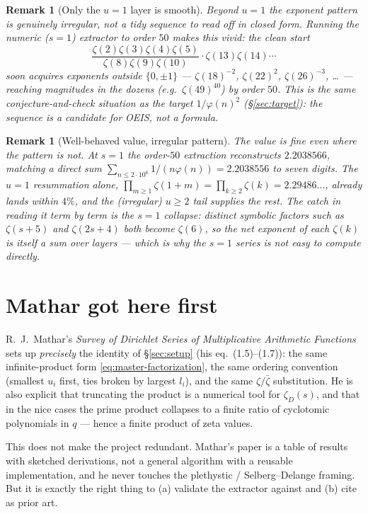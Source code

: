 \documentclass[11pt]{article}
\newtheorem{remark}[theorem]{Remark}
\newcommand{\zD}{\zeta_D}
\newcommand{\zbar}{\bar\zeta}
\begin{document}
\begin{remark}[Only the $u=1$ layer is smooth]
Beyond $u=1$ the exponent pattern is genuinely irregular, not a tidy sequence to read
off in closed form. Running the numeric ($s=1$) extractor to order $50$ makes this
vivid: the clean start
\[
\frac{\zeta(2)\zeta(3)\zeta(4)\zeta(5)}{\zeta(8)\zeta(9)\zeta(10)}\cdot
\zeta(13)\zeta(14)\cdots
\]
soon acquires exponents outside $\{0,\pm1\}$ --- $\zeta(18)^{-2}$, $\zeta(22)^{2}$,
$\zeta(26)^{-3}$, \dots{} --- reaching magnitudes in the dozens (e.g.\
$\zeta(49)^{40}$) by order $50$. This is the same conjecture-and-check situation as the
target $1/\varphi(n)^2$ (\S\ref{sec:target}): the sequence is a candidate for OEIS, not
a formula.
\end{remark}

\begin{remark}[Well-behaved value, irregular pattern]
The \emph{value} is fine even where the \emph{pattern} is not. At $s=1$ the order-$50$
extraction reconstructs $2.2038566$, matching a direct sum
$\sum_{n\le2\cdot10^{6}}1/(n\varphi(n))=2.2038556$ to seven digits. The $u=1$
resummation alone, $\prod_{m\ge1}\zeta(1+m)=\prod_{k\ge2}\zeta(k)=2.29486\ldots$,
already lands within $4\%$, and the (irregular) $u\ge2$ tail supplies the rest. The
catch in reading it term by term is the $s=1$ \emph{collapse}: distinct symbolic
factors such as $\zeta(s+5)$ and $\zeta(2s+4)$ both become $\zeta(6)$, so the net
exponent of each $\zeta(k)$ is itself a sum over layers --- which is why the $s=1$
series is not easy to compute directly.
\end{remark}

\section{Mathar got here first}

R.~J.~Mathar's \emph{Survey of Dirichlet Series of Multiplicative Arithmetic
Functions} \cite{Mathar2011} sets up \emph{precisely} the identity of
\S\ref{sec:setup} (his eq.~(1.5)--(1.7)): the same infinite-product form
\eqref{eq:master-factorization}, the same ordering convention (smallest $u_i$ first,
ties broken by largest $l_i$), and the same $\zeta/\zbar$ substitution. He is also
explicit that truncating the product is a numerical tool for $\zD(s)$, and that in
the nice cases the prime product collapses to a finite ratio of cyclotomic
polynomials in $q$ --- hence a finite product of zeta values.

This does not make the project redundant. Mathar's paper is a table of results with
sketched derivations, not a general algorithm with a reusable implementation, and he
never touches the plethystic / Selberg--Delange framing. But it is exactly the right
thing to (a) validate the extractor against and (b) cite as prior art.
\end{document}
